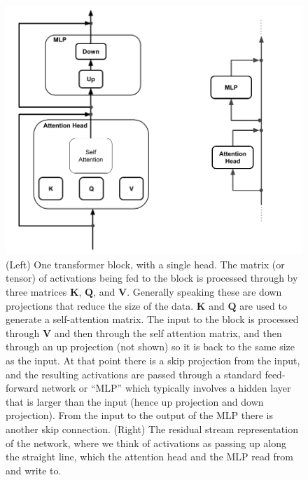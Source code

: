 \begin{figure}[ht]
\centering
\includegraphics[scale=.3]{./images/transformerBlockResidualStream.png}
\caption[Jeff Yoshimi with consultation from Tim Meyer.]{(Left) One transformer
block, with a single head. The matrix  (or tensor) of activations being fed to
the block is processed through by three matrices $\textbf{K}$, $\textbf{Q}$,
and $\textbf{V}$.  Generally speaking these are down projections that reduce
the size of the data.  $\textbf{K}$ and $\textbf{Q}$ are used to generate a
self-attention matrix. The input to the block is processed through $\textbf{V}$
and then through the self attention matrix, and then through an up projection
(not shown) so it is back to the same size as the input. At that point there is
a skip projection from the input, and the resulting activations are passed
through a standard feed-forward network or ``MLP'' which typically involves a
hidden layer that is larger than the input (hence up projection and down
projection). From the input to the output of the MLP there is another skip
connection. (Right) The residual stream representation of the network, where we
think of activations as passing up along the straight line, which the attention
head and the MLP read from and write to. }
\label{transformerBlockSimple}
\end{figure}


